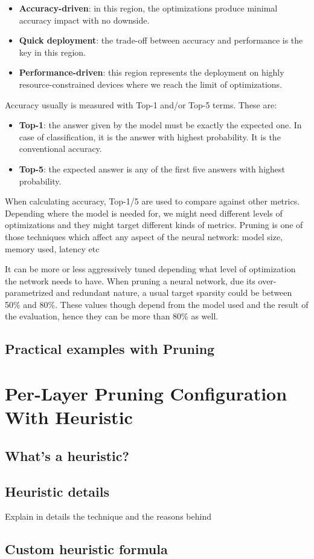 \begin{itemize}
    \item \textbf{Accuracy-driven}: in this region, the optimizations produce
        minimal accuracy impact with no downside.
    \item \textbf{Quick deployment}: the trade-off between accuracy and
        performance is the key in this region.
    \item \textbf{Performance-driven}: this region represents the deployment on
        highly resource-constrained devices where we reach the limit of
        optimizations.
\end{itemize}

Accuracy usually is measured with Top-1 and/or Top-5 terms. These are:
\begin{itemize}
    \item \textbf{Top-1}: the answer given by the model must be exactly the
        expected one. In case of classification, it is the answer with highest
        probability. It is the conventional accuracy.
    \item \textbf{Top-5}: the expected answer is any of the first five answers
        with highest probability.
\end{itemize}

When calculating accuracy, Top-1/5 are used to compare against other metrics.
Depending where the model is needed for, we might need different levels of
optimizations and they might target different kinds of metrics.
Pruning is one of those techniques which affect any aspect of the neural
network: model size, memory used, latency etc

It can be more or less aggressively tuned depending what level of optimization
the network needs to have.
When pruning a neural network, due its over-parametrized and redundant nature,
a usual target sparsity could be between 50\% and 80\%.
These values though depend from the model used and the result of the
evaluation, hence they can be more than 80\% as well.

\subsection{Practical examples with Pruning}
\lipsum[1]

\section{Per-Layer Pruning Configuration With Heuristic}\label{sec:heuristic}
\lipsum[1]

\subsection{What's a heuristic?}
\lipsum[1]

\subsection{Heuristic details}
Explain in details the technique and the reasons behind
\lipsum[1]

\subsection{Custom heuristic formula}
\lipsum[1]

